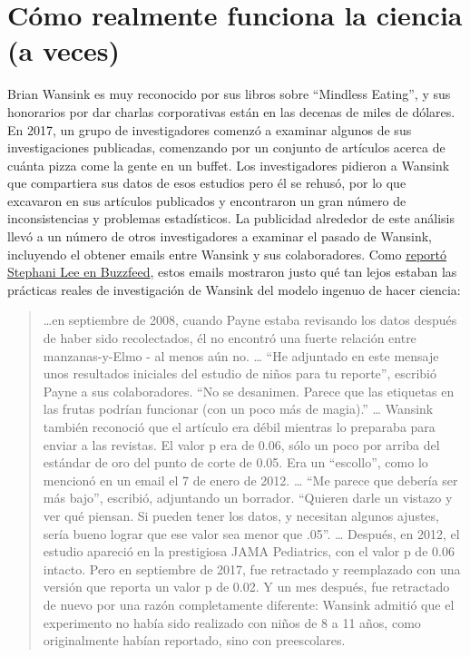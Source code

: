 \documentclass[
  12pt,
]{book}
\begin{document}
\hypertarget{cuxf3mo-realmente-funciona-la-ciencia-a-veces}{%
\section{Cómo realmente funciona la ciencia (a veces)}\label{cuxf3mo-realmente-funciona-la-ciencia-a-veces}}

Brian Wansink es muy reconocido por sus libros sobre ``Mindless Eating'', y sus honorarios por dar charlas corporativas están en las decenas de miles de dólares. En 2017, un grupo de investigadores comenzó a examinar algunos de sus investigaciones publicadas, comenzando por un conjunto de artículos acerca de cuánta pizza come la gente en un buffet. Los investigadores pidieron a Wansink que compartiera sus datos de esos estudios pero él se rehusó, por lo que excavaron en sus artículos publicados y encontraron un gran número de inconsistencias y problemas estadísticos. La publicidad alrededor de este análisis llevó a un número de otros investigadores a examinar el pasado de Wansink, incluyendo el obtener emails entre Wansink y sus colaboradores. Como \href{https://www.buzzfeednews.com/article/stephaniemlee/brian-wansink-cornell-p-hacking}{reportó Stephani Lee en Buzzfeed}, estos emails mostraron justo qué tan lejos estaban las prácticas reales de investigación de Wansink del modelo ingenuo de hacer ciencia:

\begin{quote}
\ldots en septiembre de 2008, cuando Payne estaba revisando los datos después de haber sido recolectados, él no encontró una fuerte relación entre manzanas-y-Elmo - al menos aún no. \ldots{}
``He adjuntado en este mensaje unos resultados iniciales del estudio de niños para tu reporte'', escribió Payne a sus colaboradores. ``No se desanimen. Parece que las etiquetas en las frutas podrían funcionar (con un poco más de magia).'' \ldots{}
Wansink también reconoció que el artículo era débil mientras lo preparaba para enviar a las revistas. El valor p era de 0.06, sólo un poco por arriba del estándar de oro del punto de corte de 0.05. Era un ``escollo'', como lo mencionó en un email el 7 de enero de 2012. \ldots{}
``Me parece que debería ser más bajo'', escribió, adjuntando un borrador. ``Quieren darle un vistazo y ver qué piensan. Si pueden tener los datos, y necesitan algunos ajustes, sería bueno lograr que ese valor sea menor que .05''. \ldots{}
Después, en 2012, el estudio apareció en la prestigiosa JAMA Pediatrics, con el valor p de 0.06 intacto. Pero en septiembre de 2017, fue retractado y reemplazado con una versión que reporta un valor p de 0.02. Y un mes después, fue retractado de nuevo por una razón completamente diferente: Wansink admitió que el experimento no había sido realizado con niños de 8 a 11 años, como originalmente habían reportado, sino con preescolares.
\end{quote}
\end{document}
